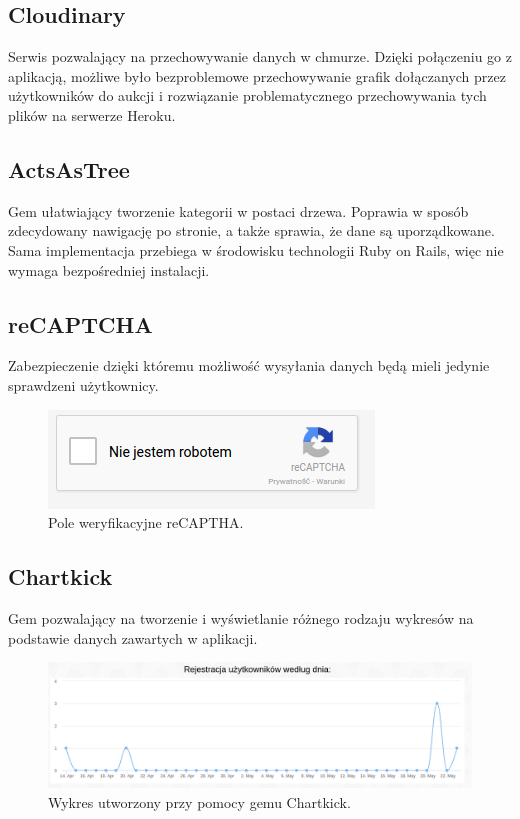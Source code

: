 \documentclass[brudnopis]{xmgr}
\begin{document}
\subsection{Cloudinary}

Serwis pozwalający na przechowywanie danych w chmurze. Dzięki połączeniu go z aplikacją, możliwe było bezproblemowe przechowywanie grafik dołączanych przez użytkowników do aukcji i rozwiązanie problematycznego przechowywania tych plików na serwerze Heroku.

\subsection{ActsAsTree}

Gem ułatwiający tworzenie kategorii w postaci drzewa. Poprawia w sposób zdecydowany nawigację
po stronie, a także sprawia, że dane są uporządkowane. Sama implementacja przebiega w środowisku
technologii Ruby on Rails, więc nie wymaga bezpośredniej instalacji.

\subsection{reCAPTCHA}

Zabezpieczenie dzięki któremu możliwość wysyłania danych będą mieli jedynie sprawdzeni użytkownicy.

\begin{figure}[!tbh]
\centering
\includegraphics[scale=0.8]{fig/captcha}
\caption{Pole weryfikacyjne reCAPTHA.}
\end{figure}


\subsection{Chartkick}

Gem pozwalający na tworzenie i wyświetlanie różnego rodzaju wykresów na podstawie danych zawartych w aplikacji.

\begin{figure}[!tbh]
\centering
\includegraphics[width=\linewidth]{fig/chart}
\caption{Wykres utworzony przy pomocy gemu Chartkick.}
\end{figure}
\end{document}
